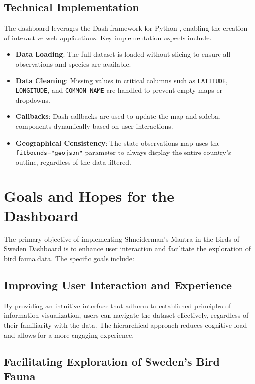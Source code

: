 \subsection{Technical Implementation}

The dashboard leverages the Dash framework for Python \cite{DashDocumentationUser}, enabling the creation of interactive web applications. Key implementation aspects include:

\begin{itemize} 
    \item \textbf{Data Loading}: The full dataset is loaded without slicing to ensure all observations and species are available. 
    \item \textbf{Data Cleaning}: Missing values in critical columns such as \texttt{LATITUDE}, \texttt{LONGITUDE}, and \texttt{COMMON NAME} are handled to prevent empty maps or dropdowns. 
    \item \textbf{Callbacks}: Dash callbacks are used to update the map and sidebar components dynamically based on user interactions. 
    \item \textbf{Geographical Consistency}: The state observations map uses the \texttt{fitbounds="geojson"} parameter to always display the entire country's outline, regardless of the data filtered. 
\end{itemize}

\section{Goals and Hopes for the Dashboard}

The primary objective of implementing Shneiderman's Mantra in the Birds of Sweden Dashboard is to enhance user interaction and facilitate the exploration of bird fauna data. The specific goals include:

\subsection{Improving User Interaction and Experience}

By providing an intuitive interface that adheres to established principles of information visualization, users can navigate the dataset effectively, regardless of their familiarity with the data. The hierarchical approach reduces cognitive load and allows for a more engaging experience.

\subsection{Facilitating Exploration of Sweden's Bird Fauna}


